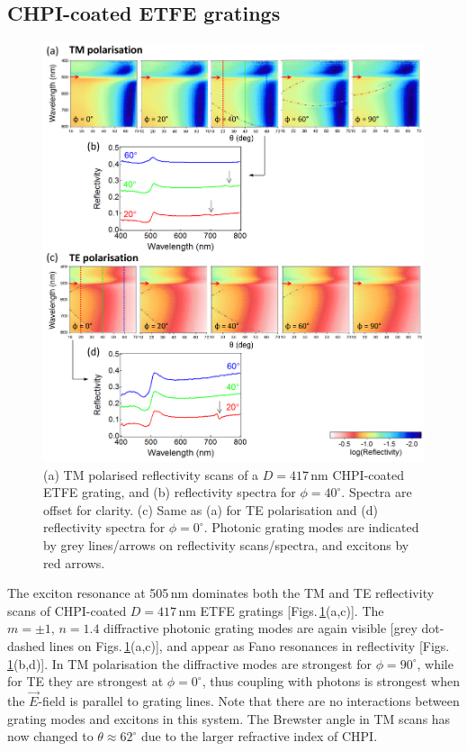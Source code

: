 \subsection{CHPI-coated ETFE gratings}
\begin{figure}[h!p] 
\centering    
\includegraphics[width=\textwidth]{Fig3}
\caption[Reflectivity measurements of a $D=417$\,nm CHPI-coated ETFE grating in (a,b) TM and (c,d) TE polarisation.]{(a) TM polarised reflectivity scans of a $D=417$\,nm CHPI-coated ETFE grating, and (b) reflectivity spectra for $\phi=40^{\circ}$. Spectra are offset for clarity. (c) Same as (a) for TE polarisation and (d) reflectivity spectra for $\phi=0^{\circ}$. Photonic grating modes are indicated by grey lines/arrows on reflectivity scans/spectra, and excitons by red arrows.}
\label{7Fig3}
\end{figure}
The exciton resonance at 505\,nm dominates both the TM and TE reflectivity scans of CHPI-coated $D=417$\,nm ETFE gratings [Figs.\,\ref{7Fig3}(a,c)]. The $m=\pm1,\,n=1.4$ diffractive photonic grating modes are again visible [grey dot-dashed lines on Figs.\,\ref{7Fig3}(a,c)], and appear as Fano resonances in reflectivity [Figs.\,\ref{7Fig3}(b,d)]. In TM polarisation the diffractive modes are strongest for $\phi=90^{\circ}$, while for TE they are strongest at $\phi=0^{\circ}$, thus coupling with photons is strongest when the $\vec{E}$-field is parallel to grating lines. Note that there are no interactions between grating modes and excitons in this system. The Brewster angle in TM scans has now changed to $\theta\approx62^{\circ}$ due to the larger refractive index of CHPI.


